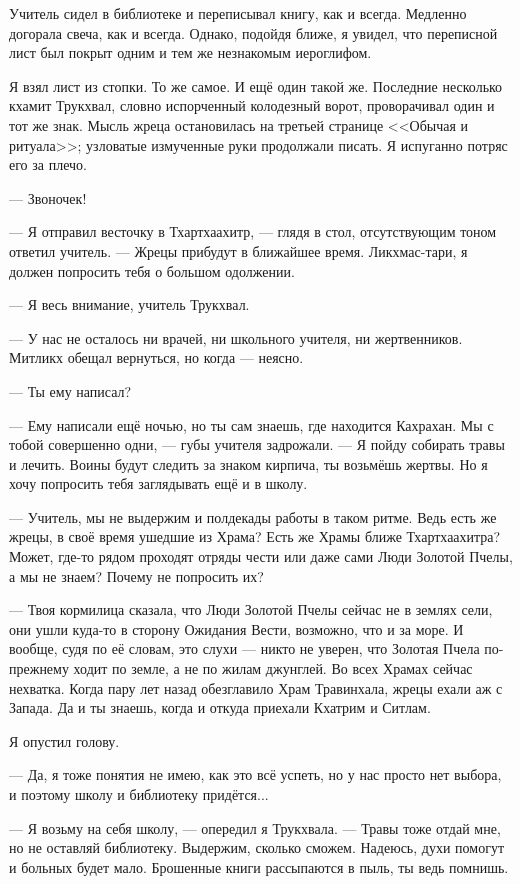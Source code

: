 Учитель сидел в библиотеке и переписывал книгу, как и всегда.
Медленно догорала свеча, как и всегда.
Однако, подойдя ближе, я увидел, что переписной лист был покрыт одним и тем же незнакомым иероглифом.

Я взял лист из стопки.
То же самое.
И ещё один такой же.
Последние несколько кхамит Трукхвал, словно испорченный колодезный ворот, проворачивал один и тот же знак.
Мысль жреца остановилась на третьей странице <<Обычая и ритуала>>;
узловатые измученные руки продолжали писать.
Я испуганно потряс его за плечо.

--- Звоночек!

--- Я отправил весточку в Тхартхаахитр, --- глядя в стол, отсутствующим тоном ответил учитель.
--- Жрецы прибудут в ближайшее время.
Ликхмас-тари, я должен попросить тебя о большом одолжении.

--- Я весь внимание, учитель Трукхвал.

--- У нас не осталось ни врачей, ни школьного учителя, ни жертвенников.
Митликх обещал вернуться, но когда --- неясно.

--- Ты ему написал?

--- Ему написали ещё ночью, но ты сам знаешь, где находится Кахрахан.
Мы с тобой совершенно одни, --- губы учителя задрожали.
--- Я пойду собирать травы и лечить.
Воины будут следить за знаком кирпича, ты возьмёшь жертвы.
Но я хочу попросить тебя заглядывать ещё и в школу.

--- Учитель, мы не выдержим и полдекады работы в таком ритме.
Ведь есть же жрецы, в своё время ушедшие из Храма?
Есть же Храмы ближе Тхартхаахитра?
Может, где-то рядом проходят отряды чести или даже сами Люди Золотой Пчелы, а мы не знаем?
Почему не попросить их?

--- Твоя кормилица сказала, что Люди Золотой Пчелы сейчас не в землях сели, они ушли куда-то в сторону Ожидания Вести, возможно, что и за море.
И вообще, судя по её словам, это слухи --- никто не уверен, что Золотая Пчела по-прежнему ходит по земле, а не по жилам джунглей.
Во всех Храмах сейчас нехватка.
Когда пару лет назад обезглавило Храм Травинхала, жрецы ехали аж с Запада.
Да и ты знаешь, когда и откуда приехали Кхатрим и Ситлам.

Я опустил голову.

--- Да, я тоже понятия не имею, как это всё успеть, но у нас просто нет выбора, и поэтому школу и библиотеку придётся...

--- Я возьму на себя школу, --- опередил я Трукхвала.
--- Травы тоже отдай мне, но не оставляй библиотеку.
Выдержим, сколько сможем.
Надеюсь, духи помогут и больных будет мало.
Брошенные книги рассыпаются в пыль, ты ведь помнишь.

